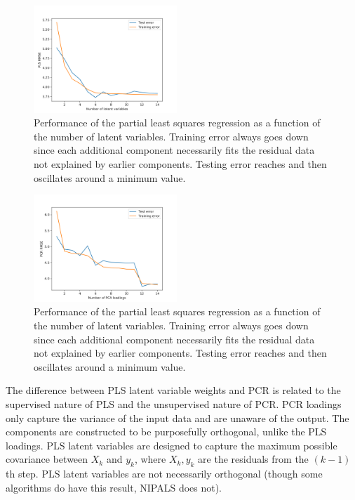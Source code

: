 \documentclass{IEEEtran}
\begin{document}
\begin{centering}
\begin{figure}
\centering
\begin{center}
	\includegraphics[width=0.48\textwidth]{rmse_vs_number_components}
	\caption{Performance of the partial least squares regression as a function of the number of latent variables. Training error always goes down since each additional component necessarily fits the residual data not explained by earlier components. Testing error reaches and then oscillates around a minimum value.\label{fig:rmse_vs_number_components}}
\end{center}
\end{figure}
\end{centering}

\begin{centering}
\begin{figure}
\centering
\begin{center}
	\includegraphics[width=0.48\textwidth]{rmse_vs_pca_loadings}
	\caption{Performance of the partial least squares regression as a function of the number of latent variables. Training error always goes down since each additional component necessarily fits the residual data not explained by earlier components. Testing error reaches and then oscillates around a minimum value.\label{fig:rmse_vs_pca_loadings}}
\end{center}
\end{figure}
\end{centering}

The difference between PLS latent variable weights and PCR is related to the supervised nature of PLS and the unsupervised nature of PCR. PCR loadings only capture the variance of the input data and are unaware of the output. The components are constructed to be purposefully orthogonal, unlike the PLS loadings. PLS latent variables are designed to capture the maximum possible covariance between $X_k$ and $y_k$, where $X_k, y_k$ are the residuals from the $(k-1)$th step. PLS latent variables are not necessarily orthogonal (though some algorithms do have this result, NIPALS does not).
\end{document}
